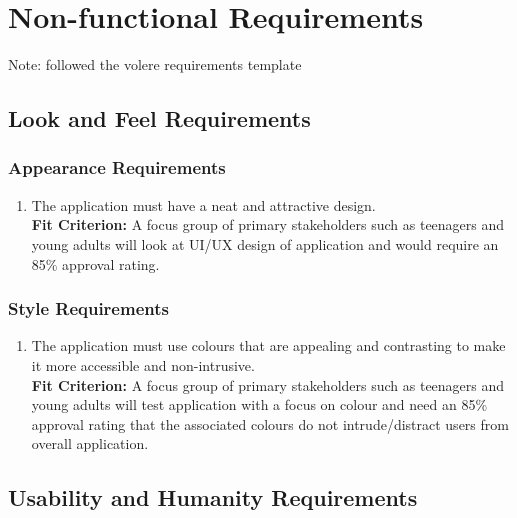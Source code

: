 \documentclass[12pt,letterpaper]{article}
\begin{document}
\section{Non-functional Requirements}
\noindent Note: followed the volere requirements template

\subsection{Look and Feel Requirements}
\subsubsection{Appearance Requirements}
\begin{enumerate}[{LF}1.] 
	\item The application must have a neat and attractive design.\\
	{\textbf{Fit Criterion:} A focus group of primary stakeholders such as teenagers and young adults will look at UI/UX design of application and would require an 85\% approval rating.}
\end{enumerate}

\subsubsection{Style Requirements}
\begin{enumerate}[resume*]  
	\item The application must use colours that are appealing and contrasting to make it more accessible and non-intrusive.\\
	{\textbf{Fit Criterion:} A focus group of primary stakeholders such as teenagers and young adults will test application with a focus on colour and need an 85\% approval rating that the associated colours do not intrude/distract users from overall application.}
\end{enumerate}

\subsection{Usability and Humanity Requirements}
\end{document}
